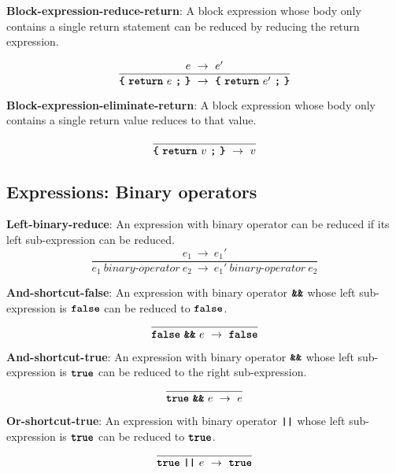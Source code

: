 \textbf{Block-expression-reduce-return}: A block expression
whose body only contains a single return statement can 
be reduced by reducing the return expression.

\[
\frac{
  e
\ \rightarrow \ 
  e'
}{  
  \textbf{\texttt{\{}} \
  \textbf{\texttt{return}} \ e \ 
  \textbf{\texttt{;}} \ 
  \textbf{\texttt{\}}}
\  \rightarrow \ 
  \textbf{\texttt{\{}} \
  \textbf{\texttt{return}} \ e' \ 
  \textbf{\texttt{;}} \ 
  \textbf{\texttt{\}}}
}
\]

\vspace{10mm}

\textbf{Block-expression-eliminate-return}: A block expression
whose body only contains a single return value reduces to
that value.

\[
\frac{
}{  
  \textbf{\texttt{\{}} \
  \textbf{\texttt{return}} \ v \ 
  \textbf{\texttt{;}} \ 
  \textbf{\texttt{\}}}
\  \rightarrow \ 
  v
}
\]



\subsection*{Expressions: Binary operators}

\textbf{Left-binary-reduce}: An expression with binary operator
can be reduced if its left sub-expression can be reduced.
\[
\frac{
  e_1 \ \rightarrow \ e_1'
}{
  e_1\  \textit{binary-operator} \ e_2
  \ \rightarrow \ 
  e_1'\  \textit{binary-operator} \ e_2
}
\]


\vspace{10mm}
\textbf{And-shortcut-false}: An expression with binary operator
$\textbf{\texttt{\&\&}}$ whose left sub-expression is
$\textbf{\texttt{false}}$ can be reduced to
$\textbf{\texttt{false}}$.
\[
\frac{
}{
  \textbf{\texttt{false}}\  \textbf{\texttt{\&\&}}\ e
  \ \rightarrow \ 
  \textbf{\texttt{false}}
}
\]

\vspace{10mm}
\textbf{And-shortcut-true}: An expression with binary operator
$\textbf{\texttt{\&\&}}$ whose left sub-expression is
$\textbf{\texttt{true}}$ can be reduced to
the right sub-expression.
\[
\frac{
}{
  \textbf{\texttt{true}}\  \textbf{\texttt{\&\&}}\ e
  \ \rightarrow \ 
  e
}
\]

\vspace{10mm}
\textbf{Or-shortcut-true}: An expression with binary operator
$\textbf{\texttt{||}}$ whose left sub-expression is
$\textbf{\texttt{true}}$ can be reduced to
$\textbf{\texttt{true}}$.
\[
\frac{
}{
  \textbf{\texttt{true}}\  \textbf{\texttt{||}}\ e
  \ \rightarrow \ 
  \textbf{\texttt{true}}
}
\]

